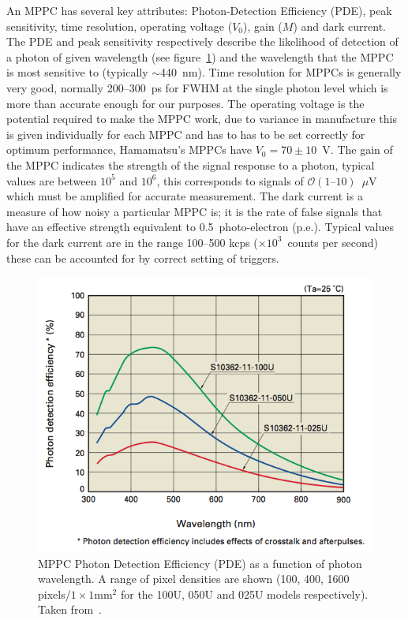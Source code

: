 An MPPC has several key attributes: Photon-Detection Efficiency (PDE), peak sensitivity, time resolution, operating voltage (\( V_0 \)), gain (\( M \)) and dark current. The PDE and peak sensitivity respectively describe the likelihood of detection of a photon of given wavelength (see figure~\ref{fig:images_intro_hamamatsu_pde_vs_wavelength}) and the wavelength that the MPPC is most sensitive to (typically \(\sim\)440~nm). Time resolution for MPPCs is generally very good, normally 200--300~ps for FWHM at the single photon level which is more than accurate enough for our purposes. The operating voltage is the potential required to make the MPPC work, due to variance in manufacture this is given individually for each MPPC and has to has to be set correctly for optimum performance, Hamamatsu's MPPCs have \( V_0 = 70\pm10 \)~V. The gain of the MPPC indicates the strength of the signal response to a photon, typical values are between \( 10^5 \) and \( 10^6 \), this corresponds to signals of \( \mathcal{O}(1\text{--}10) \)~\(\mu\)V which must be amplified for accurate measurement. The dark current is a measure of how noisy a particular MPPC is; it is the rate of false signals that have an effective strength equivalent to 0.5~photo-electron (p.e.). Typical values for the dark current are in the range 100--500 kcps (\(\times10^3\)~counts per second) these can be accounted for by correct setting of triggers.
\begin{figure}[hptb]
  \centering
    \includegraphics[width=.5\textwidth]{images/intro/hamamatsu_pde_vs_wavelength.png}
  \caption{MPPC Photon Detection Efficiency (PDE) as a function of photon wavelength. A range of pixel densities are shown (100, 400, 1600 pixels/\( 1\times1\text{mm}^2\) for the 100U, 050U and 025U models respectively). Taken from~\cite{hamamatsu_mppc}.}
  \label{fig:images_intro_hamamatsu_pde_vs_wavelength}
\end{figure}

